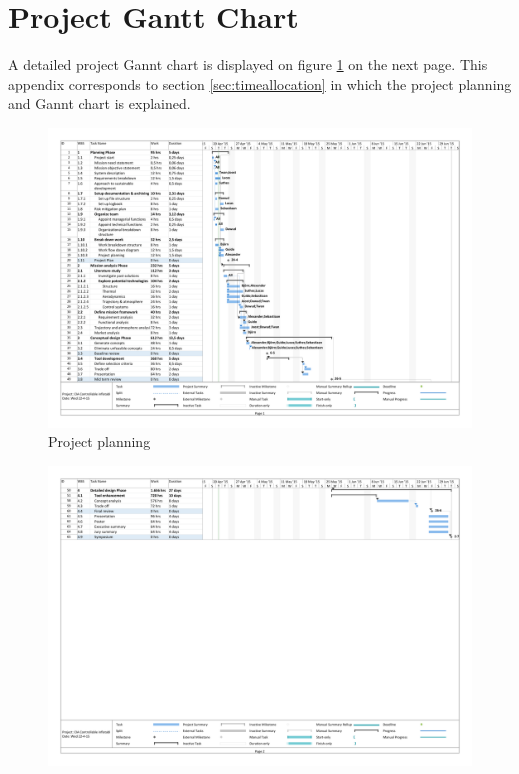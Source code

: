 \section{Project Gantt Chart}

A detailed project Gannt chart is displayed on figure \ref{fig:GanttChart} on the next page. This appendix corresponds to section \ref{sec:timeallocation} in which the project planning and Gannt chart is explained.

\begin{figure}
    \includegraphics[scale=0.6]{Figure/1_GanttChart.pdf}
    \caption{Project planning}
    \label{fig:GanttChart}
\end{figure}

\begin{figure}
    \includegraphics[scale=0.6]{Figure/2_GanttChart.pdf}
\end{figure}
